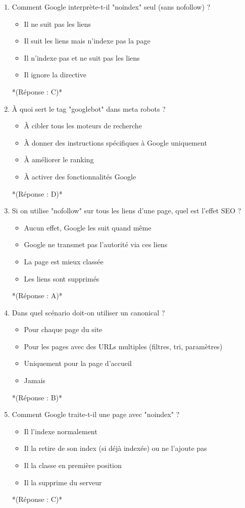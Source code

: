 \documentclass[12pt,a4paper,twoside]{report}
\begin{document}
\begin{enumerate}
\item Comment Google interprète-t-il "noindex" seul (sans nofollow) ?
\begin{itemize}
\item[A)] Il ne suit pas les liens
\item[B)] Il suit les liens mais n'indexe pas la page
\item[C)] Il n'indexe pas et ne suit pas les liens
\item[D)] Il ignore la directive
\end{itemize}
*(Réponse : C)*

\item À quoi sert le tag "googlebot" dans meta robots ?
\begin{itemize}
\item[A)] À cibler tous les moteurs de recherche
\item[B)] À donner des instructions spécifiques à Google uniquement
\item[C)] À améliorer le ranking
\item[D)] À activer des fonctionnalités Google
\end{itemize}
*(Réponse : D)*

\item Si on utilise "nofollow" sur tous les liens d'une page, quel est l'effet SEO ?
\begin{itemize}
\item[A)] Aucun effet, Google les suit quand même
\item[B)] Google ne transmet pas l'autorité via ces liens
\item[C)] La page est mieux classée
\item[D)] Les liens sont supprimés
\end{itemize}
*(Réponse : A)*

\item Dans quel scénario doit-on utiliser un canonical ?
\begin{itemize}
\item[A)] Pour chaque page du site
\item[B)] Pour les pages avec des URLs multiples (filtres, tri, paramètres)
\item[C)] Uniquement pour la page d'accueil
\item[D)] Jamais
\end{itemize}
*(Réponse : B)*

\item Comment Google traite-t-il une page avec "noindex" ?
\begin{itemize}
\item[A)] Il l'indexe normalement
\item[B)] Il la retire de son index (si déjà indexée) ou ne l'ajoute pas
\item[C)] Il la classe en première position
\item[D)] Il la supprime du serveur
\end{itemize}
*(Réponse : C)*


\end{enumerate}
\end{document}
